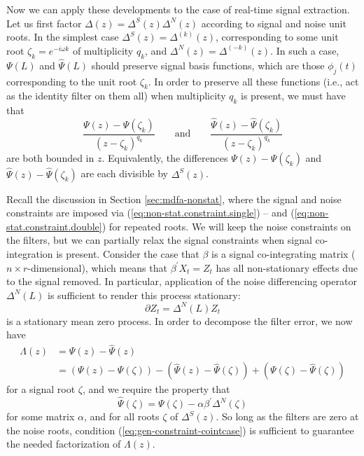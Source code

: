 \documentclass[a4paper]{book}
\begin{document}
 
 Now we can apply these developments to the case of real-time signal extraction.
  Let us first factor $\Delta (z) = \Delta^S (z)
\Delta^N (z)$ according to signal and noise unit roots. 
In the simplest case $\Delta^S (z) = \Delta^{(k)} (z)$, corresponding
 to  some unit root $\zeta_k = e^{-i \omega k}$ of
multiplicity $q_k$, and  $\Delta^N (z) = \Delta^{(-k)} (z)$.  
In such a case, 
$\Psi (L)$ and $\widehat{\Psi} (L)$ should preserve signal basis functions,
which are those $\phi_j (t)$ corresponding to the unit root
$\zeta_k$.  In order to preserve all these functions (i.e., act as
the identity filter on them all) when multiplicity $q_k$ is present,
we must have that
\[
 \frac{ \Psi (z) - \Psi (\zeta_k) }{ {( z- \zeta_k)}^{q_k} }
 \qquad \mbox{and}
 \qquad  \frac{ \widehat{\Psi} (z) - \widehat{\Psi} (\zeta_k) }{ {( z- \zeta_k)}^{q_k} }
\]
 are both bounded in $z$.  Equivalently, the differences $\Psi (z) - \Psi (\zeta_k)$ and
$  \widehat{\Psi} (z) - \widehat{\Psi} (\zeta_k)$ are each
 divisible by $\Delta^S (z)$.  
 
 Recall the discussion in Section \ref{sec:mdfa-nonstat},
  where the signal and noise constraints are imposed via
  (\ref{eq:non-stat.constraint.single}) -- and 
  (\ref{eq:non-stat.constraint.double}) for repeated roots.
  We will keep the noise constraints on the filters, but we can partially
   relax the signal constraints when signal co-integration is present.
 Consider the case that $\beta$ is a signal co-integrating matrix 
 ($n \times r$-dimensional), which means
  that $\beta^{\prime} X_t = Z_t $ has all non-stationary effects due to the signal
   removed.  In particular, application of the noise differencing operator
    $\Delta^N (L)$ is sufficient to render this process stationary:
  \[
   \partial Z_t = \Delta^N (L) Z_t
  \]
   is a stationary mean zero process.  In order to decompose the filter error,
   we now have
\begin{align*}
 \Lambda (z) & =  \Psi (z) - \widehat{\Psi} (z) \\
  & = \left( \Psi (z) - \Psi (\zeta) \right) 
   - \left( \widehat{\Psi} (z) - \widehat{\Psi} (\zeta) \right) +
    \left( \Psi (\zeta) - \widehat{\Psi} (\zeta) \right)
  \end{align*}
  for a signal root $\zeta$, and we require the property that
 \begin{equation}
  \label{eq:gen-constraint-cointcase}
   \widehat{\Psi} (\zeta) = \Psi (\zeta) - \alpha \beta^{\prime} \Delta^N (\zeta)
  \end{equation}
  for some matrix $\alpha$, and for all roots $\zeta$ of $\Delta^S (z)$.
  So long as the filters are zero at the noise roots, condition
  (\ref{eq:gen-constraint-cointcase}) is sufficient to guarantee the needed
  factorization of $\Lambda (z)$.
  
\end{document}
